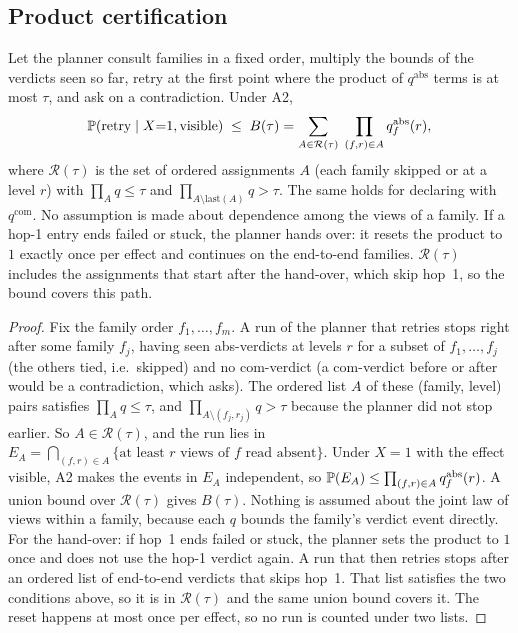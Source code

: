 \subsection{Product certification}
\begin{proposition}
\label{prop:family}
Let the planner consult families in a fixed order, multiply the bounds of the verdicts seen so far, retry at the first point where the product of
$q^{\mathrm{abs}}$ terms is at most $\tau$, and ask on a contradiction. Under A2,
\[
\mathbb{P}(\text{retry}\mid X{=}1,\text{visible})\;\le\;B(\tau)=\sum_{A\in\mathcal R(\tau)}\;\prod_{(f,r)\in A}q^{\mathrm{abs}}_f(r),
\]
where $\mathcal R(\tau)$ is the set of ordered assignments $A$ (each family skipped or at a level $r$) with $\prod_A q\le\tau$ and $\prod_{A\setminus\mathrm{last}(A)}q>\tau$.
The same holds for declaring with $q^{\mathrm{com}}$. No assumption is made about dependence among the views of a family.
If a hop-1 entry ends failed or stuck, the planner hands over: it resets the product to $1$ exactly once per effect and continues on the end-to-end families.
$\mathcal R(\tau)$ includes the assignments that start after the hand-over, which skip hop~1, so the bound covers this path.
\end{proposition}
\begin{proof}
Fix the family order $f_1,\dots,f_m$. A run of the planner that retries stops right after some family $f_j$, having seen abs-verdicts at levels $r$ for a subset of
$f_1,\dots,f_j$ (the others tied, i.e.\ skipped) and no com-verdict (a com-verdict before or after would be a contradiction, which asks). The ordered list $A$ of these
(family, level) pairs satisfies $\prod_Aq\le\tau$, and $\prod_{A\setminus(f_j,r_j)}q>\tau$ because the planner did not stop earlier. So $A\in\mathcal R(\tau)$, and the run lies in
$E_A=\bigcap_{(f,r)\in A}\{\text{at least $r$ views of $f$ read absent}\}$. Under $X{=}1$ with the effect visible, A2 makes the events in $E_A$ independent, so
$\mathbb{P}(E_A)\le\prod_{(f,r)\in A}q^{\mathrm{abs}}_f(r)$. A union bound over $\mathcal R(\tau)$ gives $B(\tau)$. Nothing is assumed about the joint law of views within a family,
because each $q$ bounds the family's verdict event directly.
For the hand-over: if hop~1 ends failed or stuck, the planner sets the product to $1$ once and does not use the hop-1 verdict again. A run that then retries stops after an ordered
list of end-to-end verdicts that skips hop~1. That list satisfies the two conditions above, so it is in $\mathcal R(\tau)$ and the same union bound covers it. The reset happens at most
once per effect, so no run is counted under two lists.
\end{proof}



